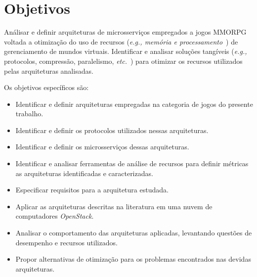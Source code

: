 \section{Objetivos}
\label{obj}

Análisar e definir arquiteturas de microsserviços empregados a jogos \ac{MMORPG} voltada a otimização do uso de recursos (\textit{\textit{e.g.,} memória e processamento}~\cite{1417630}) de gerenciamento de mundos virtuais.
%
Identificar e analisar soluções tangíveis (\textit{e.g.,} protocolos, compressão, paralelismo, \textit{etc.}~\cite{1417630}) para otimizar os recursos utilizados pelas arquiteturas analisadas.

Os objetivos específicos são:
\begin{itemize}
    \item Identificar e definir arquiteturas empregadas na categoria de jogos do presente trabalho.
    \item Identificar e definir os protocolos utilizados nessas arquiteturas.
    \item Identificar e definir os microsserviços dessas arquiteturas.
    \item Identificar e analisar ferramentas de análise de recursos para definir métricas as arquiteturas identificadas e caracterizadas.
    \item Especificar requisitos para a arquitetura estudada.
    \item Aplicar as arquiteturas descritas na literatura em uma nuvem de computadores \textit{OpenStack}.
    \item Analisar o comportamento das arquiteturas aplicadas, levantando questões de desempenho e recursos utilizados.
    \item Propor alternativas de otimização para os problemas encontrados nas devidas arquiteturas.
\end{itemize}
